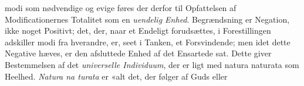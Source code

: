 \documentclass[12pt,a4paper]{book}
\begin{document}
modi som nødvendige og evige føres der derfor til Opfattelsen
af Modificationernes Totalitet som en \emph{uendelig Enhed}.
Begrændsning er Negation, ikke noget Positivt; det, der, naar
et Endeligt forudsættes, i Forestillingen adskiller modi fra
hverandre, er, seet i Tanken, et Forsvindende; men idet dette
Negative hæves, er den afsluttede Enhed af det Ensartede sat.
Dette giver Bestemmelsen af det \emph{universelle Individuum},
der er ligt med natura naturata som Heelhed. \emph{Natura na\-%
turata} er «alt det, der følger af Guds eller
%
%
%
\end{document}
